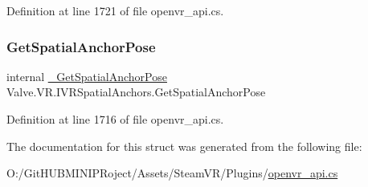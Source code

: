 Definition at line 1721 of file openvr\+\_\+api.\+cs.

\mbox{\label{struct_valve_1_1_v_r_1_1_i_v_r_spatial_anchors_ac27617bf362509c867246ac03560eafe}} 
\subsubsection{\texorpdfstring{GetSpatialAnchorPose}{GetSpatialAnchorPose}}
{\footnotesize\ttfamily internal \mbox{\hyperlink{struct_valve_1_1_v_r_1_1_i_v_r_spatial_anchors_a77ab8b9b1a7b448eab589d2d84b43ca5}{\+\_\+\+Get\+Spatial\+Anchor\+Pose}} Valve.\+V\+R.\+I\+V\+R\+Spatial\+Anchors.\+Get\+Spatial\+Anchor\+Pose}



Definition at line 1716 of file openvr\+\_\+api.\+cs.



The documentation for this struct was generated from the following file\+:\begin{DoxyCompactItemize}
\item 
O\+:/\+Git\+H\+U\+B\+M\+I\+N\+I\+P\+Roject/\+Assets/\+Steam\+V\+R/\+Plugins/\mbox{\hyperlink{openvr__api_8cs}{openvr\+\_\+api.\+cs}}\end{DoxyCompactItemize}
